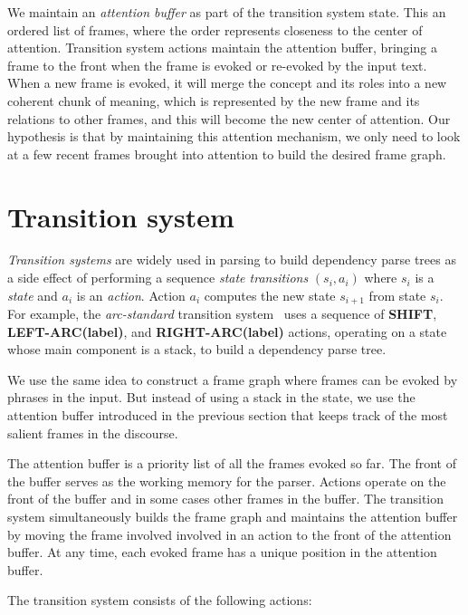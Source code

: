 \documentclass[11pt,a4paper]{article}
\begin{document}
We maintain an \emph{attention buffer} as part of the transition system state.
This an ordered list of frames, where the order represents closeness to the
center of attention. Transition system actions maintain the attention buffer, bringing
a frame to the front when the frame is evoked or re-evoked by the input text.
When a new frame is evoked, it will merge the concept and its roles into a new
coherent chunk of meaning, which is represented by the new frame and its
relations to other frames, and this will become the new center of attention.
Our hypothesis is that by maintaining this attention mechanism, we only need to
look at a few recent frames brought into attention to build the desired
frame graph.

\section{Transition system}
\label{sec:ts}

\emph{Transition systems} are widely
used in parsing to build dependency parse trees as a side effect of performing a sequence \emph{state transitions}
$(s_i,a_i)$ where $s_i$ is a \emph{state} and $a_i$ is an \emph{action}. Action $a_i$ computes the new state
$s_{i+1}$ from state $s_i$. For example, the \emph{arc-standard}
transition system~\cite{nivre2006} uses a sequence of {\bf SHIFT}, {\bf LEFT-ARC(label)}, and
{\bf RIGHT-ARC(label)} actions, operating on a state whose main component is a stack, to build a dependency parse tree.

We use the same idea to construct a frame graph where frames can be
evoked by phrases in the input. But instead of using a stack in the state, we use the  attention
buffer introduced in the previous section that keeps track of the most salient
frames in the discourse.

The attention buffer is a priority list of all the
frames evoked so far. The front of the buffer serves as the working
memory for the parser. Actions operate on the front of the buffer and in some cases other frames in the buffer. The transition
system simultaneously builds the frame graph and maintains the attention buffer
by moving the frame involved involved in an action to the front of the attention
buffer. At any time, each evoked frame has a unique position in the attention
buffer.

The transition system consists of the following actions:
\end{document}
